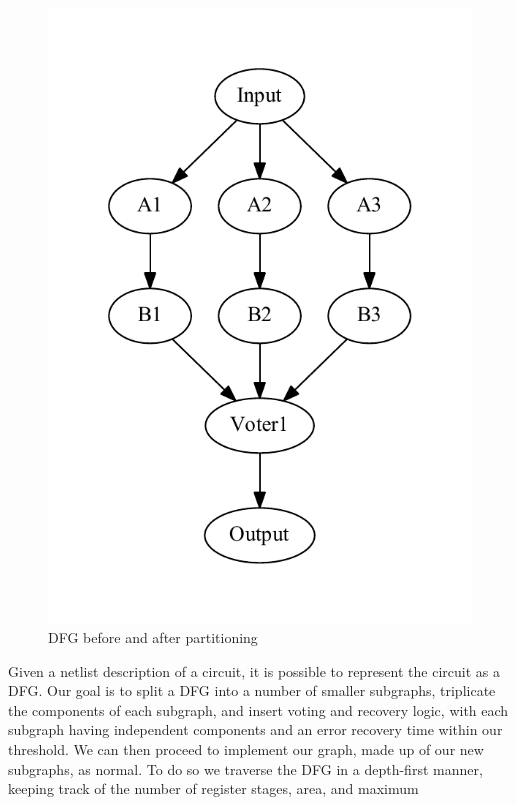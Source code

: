 \documentclass[12pt,final,oneside]{dwThesis} %
\begin{document}
\begin{figure}
\begin{center}
         \includegraphics[height=0.3\textheight]{images/TMR-post.pdf}
         \caption{\gls{DFG} before and after partitioning} \label{TMRFigure}

      \end{center}

   \end{figure}
   Given a netlist description of a circuit, it is
   possible to represent the circuit as a \gls{DFG}\cite{FPGAArch}. Our goal is
   to split a \gls{DFG} into a number of smaller subgraphs, triplicate the
   components of each subgraph, and insert voting and recovery logic, with each
   subgraph having independent components and an error recovery time within our
   threshold. We can then proceed to implement our graph, made up of our new
   subgraphs, as normal.  To do so we traverse the \gls{DFG} in a depth-first
   manner, keeping track of the number of register stages, area, and maximum
\end{document}
